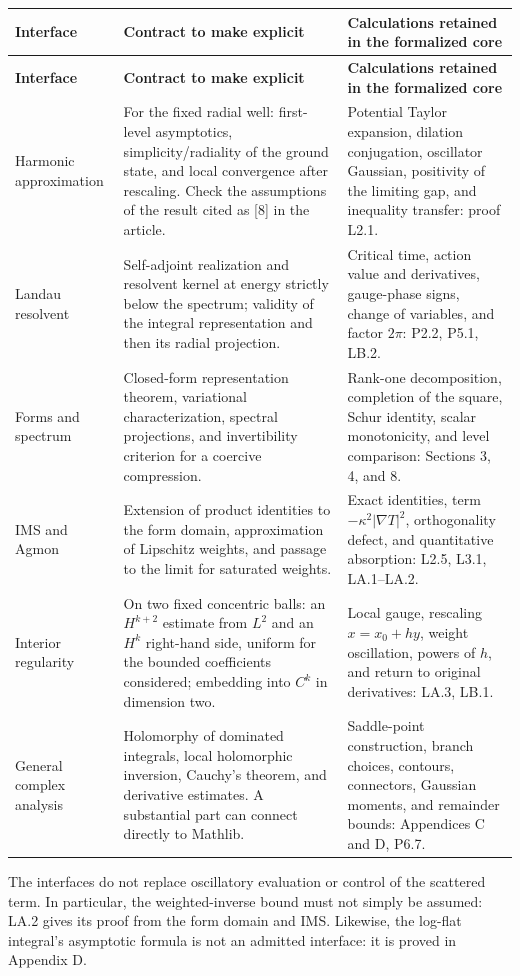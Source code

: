 \documentclass[11pt,a4paper]{article}
\begin{document}
\small
\begin{longtable}{@{}>{\raggedright\arraybackslash}p{}>{\raggedright\arraybackslash}p{}>{\raggedright\arraybackslash}p{}@{}}
\textbf{Interface}&\textbf{Contract to make explicit}&\textbf{Calculations retained in the formalized core}\\\hline
\endfirsthead
\textbf{Interface}&\textbf{Contract to make explicit}&\textbf{Calculations retained in the formalized core}\\\hline
\endhead
Harmonic approximation&For the fixed radial well: first-level asymptotics, simplicity/radiality of the ground state, and local convergence after rescaling. Check the assumptions of the result cited as [8] in the article.&Potential Taylor expansion, dilation conjugation, oscillator Gaussian, positivity of the limiting gap, and inequality transfer: proof L2.1.\\[7pt]
Landau resolvent&Self-adjoint realization and resolvent kernel at energy strictly below the spectrum; validity of the integral representation and then its radial projection.&Critical time, action value and derivatives, gauge-phase signs, change of variables, and factor $2\pi$: P2.2, P5.1, LB.2.\\[7pt]
Forms and spectrum&Closed-form representation theorem, variational characterization, spectral projections, and invertibility criterion for a coercive compression.&Rank-one decomposition, completion of the square, Schur identity, scalar monotonicity, and level comparison: Sections 3, 4, and 8.\\[7pt]
IMS and Agmon&Extension of product identities to the form domain, approximation of Lipschitz weights, and passage to the limit for saturated weights.&Exact identities, term $-\kappa^2|\nabla T|^2$, orthogonality defect, and quantitative absorption: L2.5, L3.1, LA.1--LA.2.\\[7pt]
Interior regularity&On two fixed concentric balls: an $H^{k+2}$ estimate from $L^2$ and an $H^k$ right-hand side, uniform for the bounded coefficients considered; embedding into $C^k$ in dimension two.&Local gauge, rescaling $x=x_0+hy$, weight oscillation, powers of $h$, and return to original derivatives: LA.3, LB.1.\\[7pt]
General complex analysis&Holomorphy of dominated integrals, local holomorphic inversion, Cauchy's theorem, and derivative estimates. A substantial part can connect directly to Mathlib.&Saddle-point construction, branch choices, contours, connectors, Gaussian moments, and remainder bounds: Appendices C and D, P6.7.\\
\end{longtable}
\normalsize
The interfaces do not replace oscillatory evaluation or control of the
scattered term. In particular, the weighted-inverse bound must not simply be
assumed: LA.2 gives its proof from the form domain and IMS. Likewise, the
log-flat integral's asymptotic formula is not an admitted interface: it is
proved in Appendix D.
\end{document}
